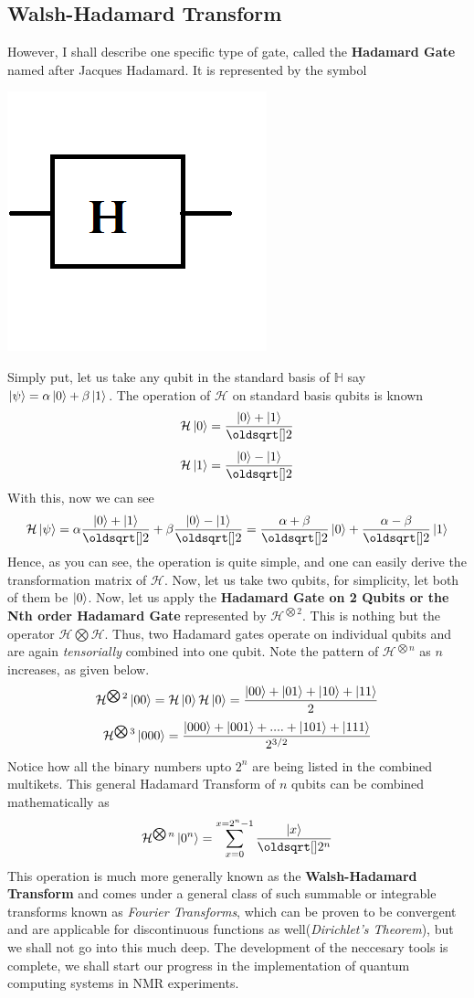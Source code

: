 \documentclass[12pt]{article}
\begin{document}
\subsection{Walsh-Hadamard Transform}
However, I shall describe one specific type of gate, called the \textbf{Hadamard Gate} named after Jacques Hadamard. It is represented by the symbol 
\begin{center}
\includegraphics[scale=0.5]{qhad.png}
\end{center}
Simply put, let us take any qubit in the standard basis of $\mathbb{H}$ say $\Ket{\psi} = \alpha\Ket{0} + \beta\Ket{1}$. The operation of $\mathcal{H}$ on standard basis qubits is known $$\mathcal{H}\Ket{0} = \frac{\Ket{0}+\Ket{1}}{\sqrt{2}}$$
$$\mathcal{H}\Ket{1} = \frac{\Ket{0}-\Ket{1}}{\sqrt{2}}$$
With this, now we can see
$$\mathcal{H}\Ket{\psi} = \alpha\frac{\Ket{0}+\Ket{1}}{\sqrt{2}} + \beta\frac{\Ket{0}-\Ket{1}}{\sqrt{2}} = \frac{\alpha + \beta}{\sqrt{2}}\Ket{0} + \frac{\alpha - \beta}{\sqrt{2}}\Ket{1}$$
Hence, as you can see, the operation is quite simple, and one can easily derive the transformation matrix of $\mathcal{H}$. Now, let us take two qubits, for simplicity, let both of them be $\Ket{0}$. Now, let us apply the \textbf{Hadamard Gate on 2 Qubits or the Nth order Hadamard Gate} represented by $\mathcal{H}^{\bigotimes 2}$. This is nothing but the operator $\mathcal{H}\bigotimes\mathcal{H}$. Thus, two Hadamard gates operate on individual qubits and are again \textit{tensorially} combined into one qubit. Note the pattern of $\mathcal{H}^{\bigotimes n}$ as $n$ increases, as given below.
$$\mathcal{H}^{\bigotimes 2}\Ket{00} = \mathcal{H}\Ket{0}\mathcal{H}\Ket{0} = \frac{\Ket{00}+\Ket{01}+\Ket{10}+\Ket{11}}{2}$$
$$\mathcal{H}^{\bigotimes 3}\Ket{000} = \frac{\Ket{000}+\Ket{001}+....+\Ket{101}+\Ket{111}}{2^{3/2}}$$ Notice how all the binary numbers upto $2^n$ are being listed in the combined multikets. This general Hadamard Transform of $n$ qubits can be combined mathematically as
$$\mathcal{H}^{\bigotimes n}\Ket{0^n} = \sum_{x=0}^{x=2^n-1}\frac{\Ket{x}}{\sqrt{2^n}}$$ This operation is much more generally known as the \textbf{Walsh-Hadamard Transform} and comes under a general class of such summable or integrable transforms known as \textit{Fourier Transforms}, which can be proven to be convergent and are applicable for discontinuous functions as well(\textit{Dirichlet's Theorem}), but we shall not go into this much deep. The development of the neccesary tools is complete, we shall start our progress in the implementation of quantum computing systems in NMR experiments.
\end{document}
